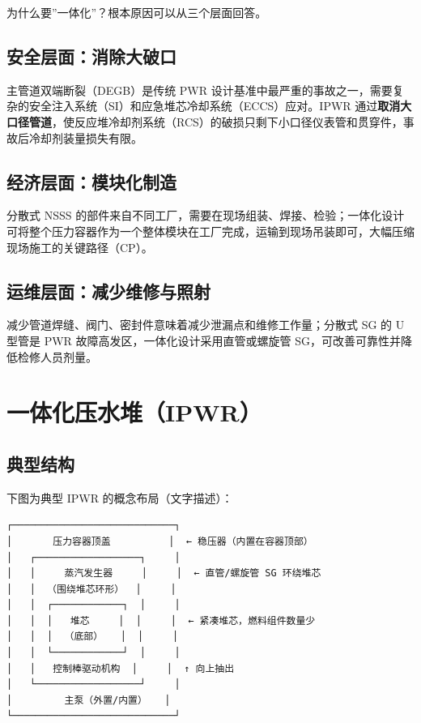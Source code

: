 \documentclass[
  UTF8,
  scheme=plain,
  fontsize=10pt,
  openany
]{ctexbook}
\begin{document}
为什么要''一体化''？根本原因可以从三个层面回答。

\subsection{安全层面：消除大破口}\label{ux5b89ux5168ux5c42ux9762ux6d88ux9664ux5927ux7834ux53e3}

主管道双端断裂（DEGB）是传统 PWR
设计基准中最严重的事故之一，需要复杂的安全注入系统（SI）和应急堆芯冷却系统（ECCS）应对。IPWR
通过\textbf{取消大口径管道}，使反应堆冷却剂系统（RCS）的破损只剩下小口径仪表管和贯穿件，事故后冷却剂装量损失有限。

\subsection{经济层面：模块化制造}\label{ux7ecfux6d4eux5c42ux9762ux6a21ux5757ux5316ux5236ux9020}

分散式 NSSS
的部件来自不同工厂，需要在现场组装、焊接、检验；一体化设计可将整个压力容器作为一个整体模块在工厂完成，运输到现场吊装即可，大幅压缩现场施工的关键路径（CP）。

\subsection{运维层面：减少维修与照射}\label{ux8fd0ux7ef4ux5c42ux9762ux51cfux5c11ux7ef4ux4feeux4e0eux7167ux5c04}

减少管道焊缝、阀门、密封件意味着减少泄漏点和维修工作量；分散式 SG 的 U
型管是 PWR 故障高发区，一体化设计采用直管或螺旋管
SG，可改善可靠性并降低检修人员剂量。

\section{一体化压水堆（IPWR）}\label{ux4e00ux4f53ux5316ux538bux6c34ux5806ipwr}

\subsection{典型结构}\label{ux5178ux578bux7ed3ux6784}

下图为典型 IPWR 的概念布局（文字描述）：

\begin{verbatim}┌────────────────────────────┐
│       压力容器顶盖          │  ← 稳压器（内置在容器顶部）
│   ┌──────────────────┐     │
│   │     蒸汽发生器     │     │  ← 直管/螺旋管 SG 环绕堆芯
│   │  （围绕堆芯环形）  │     │
│   │  ┌────────────┐  │     │
│   │  │   堆芯     │  │     │  ← 紧凑堆芯，燃料组件数量少
│   │  │  （底部）   │  │     │
│   │  └────────────┘  │     │
│   │   控制棒驱动机构  │     │  ↑ 向上抽出
│   └──────────────────┘     │
│         主泵（外置/内置）   │
└────────────────────────────┘\end{verbatim}
\end{document}
